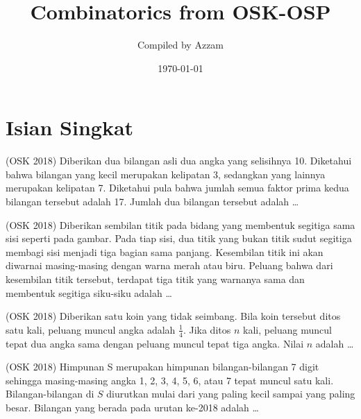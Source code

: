 \documentclass[12pt]{scrartcl}
\begin{document}
	\title{Combinatorics from OSK-OSP} %
	\date{\today}
	\author{Compiled by Azzam}


\newpage
	\section{Isian Singkat}
	
	\begin{soalbaru}(OSK 2018) Diberikan dua bilangan asli dua angka yang selisihnya 10. Diketahui bahwa bilangan yang kecil merupakan kelipatan 3, sedangkan yang lainnya merupakan kelipatan 7. Diketahui pula bahwa jumlah semua faktor prima kedua bilangan tersebut adalah 17. Jumlah dua bilangan tersebut adalah \dots
	
	\end{soalbaru}
	
	\begin{soalbaru}(OSK 2018)
Diberikan sembilan titik pada bidang yang membentuk segitiga sama sisi seperti pada gambar. Pada tiap sisi, dua titik yang bukan titik sudut segitiga membagi sisi menjadi tiga bagian sama panjang. Kesembilan titik ini akan diwarnai masing-masing dengan warna merah atau biru. Peluang bahwa dari kesembilan titik tersebut, terdapat tiga titik yang warnanya sama dan membentuk segitiga siku-siku adalah \dots
\begin{center}
\end{center}
	\end{soalbaru}
	
	\begin{soalbaru}
	(OSK 2018) Diberikan satu koin yang tidak seimbang. Bila koin tersebut ditos satu kali, peluang muncul angka adalah $\frac{1}{4}$. Jika ditos $n$ kali, peluang muncul tepat dua angka sama dengan peluang muncul tepat tiga angka. Nilai $n$ adalah \dots
	\end{soalbaru}
	
	\begin{soalbaru}
	(OSK 2018) Himpunan S merupakan himpunan bilangan-bilangan 7 digit sehingga masing-masing angka 1, 2, 3,
4, 5, 6, atau 7 tepat muncul satu kali. Bilangan-bilangan di $S$ diurutkan mulai dari yang paling kecil
sampai yang paling besar. Bilangan yang berada pada urutan ke-2018 adalah \dots
	\end{soalbaru}
	
\end{document}
